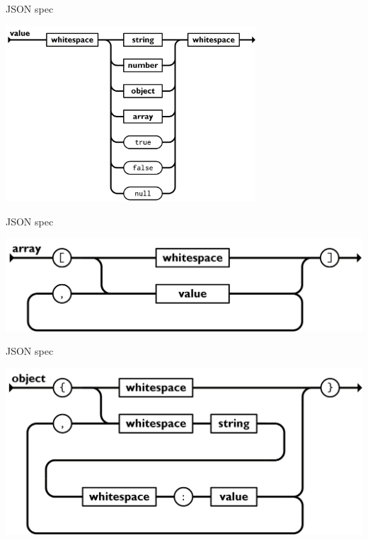 \documentclass{beamer}
\begin{document}
\begin{frame}[fragile]{JSON spec}
  \begin{center}
    \includegraphics[width=0.7\textwidth]{images/json-value.png}
  \end{center}
\end{frame}

\begin{frame}[fragile]{JSON spec}
  \begin{center}
    \includegraphics[width=\textwidth]{images/json-array.png}
  \end{center}
\end{frame}

\begin{frame}[fragile]{JSON spec}
  \begin{center}
    \includegraphics[width=\textwidth]{images/json-object.png}
  \end{center}
\end{frame}
\end{document}
